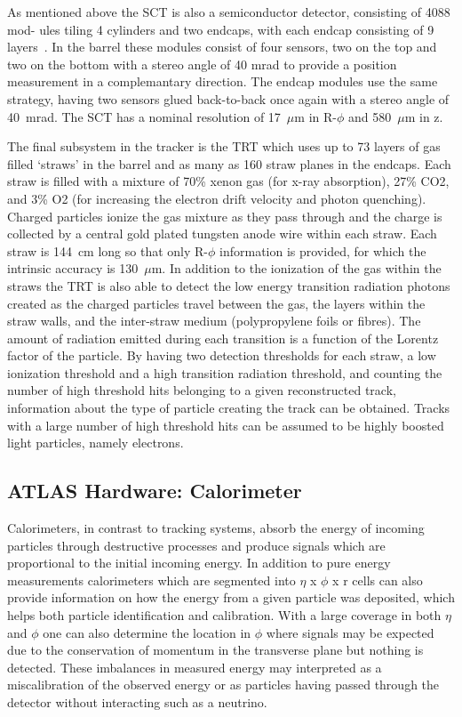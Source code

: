 As mentioned above the SCT is also a semiconductor detector, consisting of 4088 mod- ules tiling 4 cylinders and two endcaps, with each endcap consisting of 9 layers~\cite{JOIATLAS}.  
In the barrel these modules consist of four sensors, two on the top and two on the bottom with a stereo angle of 40 mrad to provide a position measurement in a complemantary direction.  
The endcap modules use the same strategy, having two sensors glued back-to-back once again with a stereo angle of 40~mrad.  
The SCT has a nominal resolution of 17~$\mu$m in R-$\phi$ and 580~$\mu$m in z.  

The final subsystem in the tracker is the TRT which uses up to 73 layers of gas filled `straws' in the barrel and as many as 160 straw planes in the endcaps.  
Each straw is filled with a mixture of 70\% xenon gas (for x-ray absorption), 27\% CO2, and 3\% O2 (for increasing the electron drift velocity and photon quenching).  
Charged particles ionize the gas mixture as they pass through and the charge is collected by a central gold plated tungsten anode wire within each straw.  
Each straw is 144~cm long so that only R-$\phi$ information is provided, for which the intrinsic accuracy is 130~$\mu$m.  
In addition to the ionization of the gas within the straws the TRT is also able to detect the low energy transition radiation photons created as the charged particles travel between the gas, the layers within the straw walls, and the inter-straw medium (polypropylene foils or fibres).  
The amount of radiation emitted during each transition is a function of the Lorentz factor of the particle.  
By having two detection thresholds for each straw, a low ionization threshold and a high transition radiation threshold, and counting the number of high threshold hits belonging to a given reconstructed track, information about the type of particle creating the track can be obtained.  
Tracks with a large number of high threshold hits can be assumed to be highly boosted light particles, namely electrons.  

\subsection{ATLAS Hardware: Calorimeter}
Calorimeters, in contrast to tracking systems, absorb the energy of incoming particles through destructive processes and produce signals which are proportional to the initial incoming energy.  
In addition to pure energy measurements calorimeters which are segmented into $\eta$ x $\phi$ x r cells can also provide information on how the energy from a given particle was deposited, which helps both particle identification and calibration.  
With a large coverage in both $\eta$ and $\phi$ one can also determine the location in $\phi$ where signals may be expected due to the conservation of momentum in the transverse plane but nothing is detected.  
These imbalances in measured energy may interpreted as a miscalibration of the observed energy or as particles having passed through the detector without interacting such as a neutrino.

